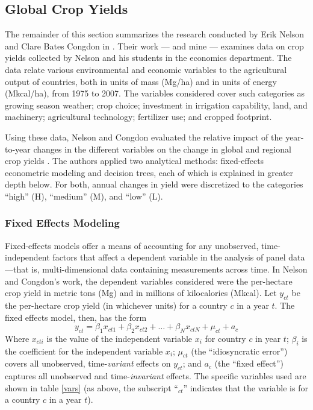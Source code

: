\documentclass[12pt]{article}
\begin{document}
\subsection{Global Crop Yields}

The remainder of this section summarizes the research conducted by Erik Nelson and Clare Bates Congdon in \cite{nelson_measuring_2016}. Their work --- and mine --- examines data on crop yields collected by Nelson and his students in the economics department. The data relate various environmental and economic variables to the agricultural output of countries, both in units of mass (Mg/ha) and in units of energy (Mkcal/ha), from 1975 to 2007. The variables considered cover such categories as growing season weather; crop choice; investment in irrigation capability, land, and machinery; agricultural technology; fertilizer use; and cropped footprint. 

Using these data, Nelson and Congdon evaluated the relative impact of the year-to-year changes in the different variables on the change in global and regional crop yields \cite{nelson_measuring_2016}. The authors applied two analytical methods: fixed-effects econometric modeling and decision trees, each of which is explained in greater depth below. For both, annual changes in yield were discretized to the categories ``high'' (H), ``medium'' (M), and ``low'' (L). 


\subsubsection{Fixed Effects Modeling}

Fixed-effects models offer a means of accounting for any unobserved, time-independent factors that affect a dependent variable in the analysis of panel data---that is, multi-dimensional data containing measurements across time. In Nelson and Congdon's work, the dependent variables considered were the per-hectare crop yield in metric tons (Mg) and in millions of kilocalories (Mkcal). Let $y_{ct}$ be the per-hectare crop yield (in whichever units) for a country $c$ in a year $t$. The fixed effects model, then, has the form
$$y_{ct} = \beta_1x_{ct1} + \beta_2x_{ct2} + \ldots + \beta_Nx_{ctN} + \mu_{ct} + a_c$$
Where $x_{cti}$ is the value of the independent variable $x_i$ for country $c$ in year $t$; $\beta_i$ is the coefficient for the independent variable $x_i$; $\mu_{ct}$ (the ``idiosyncratic error'') covers all unobserved, time-\emph{variant} effects  on $y_{ct}$; and $a_c$ (the ``fixed effect'') captures all unobserved and time-\emph{invariant} effects.
The specific variables used are shown in table \ref{vars} (as above, the subscript ``$_{ct}$'' indicates that the variable is for a country $c$ in a year $t$).
\end{document}
